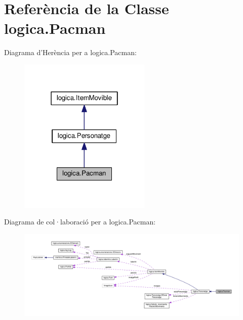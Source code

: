 \hypertarget{classlogica_1_1_pacman}{\section{Referència de la Classe logica.\+Pacman}
\label{classlogica_1_1_pacman}
}


Diagrama d'Herència per a logica.\+Pacman\+:\nopagebreak
\begin{figure}[H]
\begin{center}
\leavevmode
\includegraphics[width=178pt]{classlogica_1_1_pacman__inherit__graph}
\end{center}
\end{figure}


Diagrama de col·laboració per a logica.\+Pacman\+:\nopagebreak
\begin{figure}[H]
\begin{center}
\leavevmode
\includegraphics[width=350pt]{classlogica_1_1_pacman__coll__graph}
\end{center}
\end{figure}
